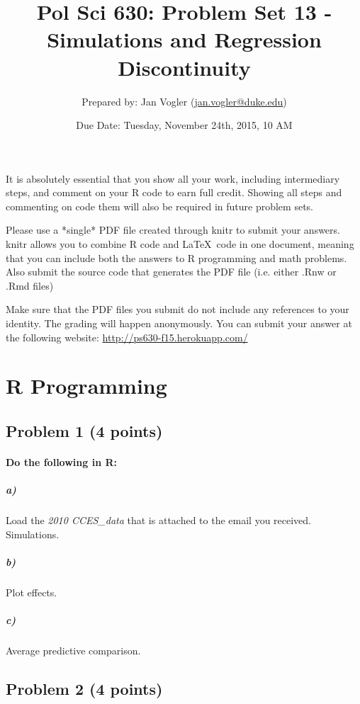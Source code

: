 \documentclass[12pt]{article}
\begin{document}
\title{Pol Sci 630: Problem Set 13 - Simulations and Regression Discontinuity}

\author{Prepared by: Jan Vogler (\href{mailto:jan.vogler@duke.edu}{jan.vogler@duke.edu})}

\date{Due Date: Tuesday, November 24th, 2015, 10 AM}
 
\maketitle 



It is absolutely essential that you show all your work, including intermediary steps, and comment on your R code to earn full credit. Showing all steps and commenting on code them will also be required in future problem sets.

Please use a *single* PDF file created through knitr to submit your answers. knitr allows you to combine R code and \LaTeX \ code in one document, meaning that you can include both the answers to R programming and math problems. Also submit the source code that generates the PDF file (i.e. either .Rnw or .Rmd files)

Make sure that the PDF files you submit do not include any references to your identity. The grading will happen anonymously. You can submit your answer at the following website: \url{http://ps630-f15.herokuapp.com/}



\section*{R Programming}

\subsection*{Problem 1 (4 points)}

\paragraph{Do the following in R:}

\subparagraph{a)} Load the \textit{2010 CCES\_data} that is attached to the email you received. Simulations.

\subparagraph{b)} Plot effects.

\subparagraph{c)} Average predictive comparison.



\subsection*{Problem 2 (4 points)}
\end{document}
